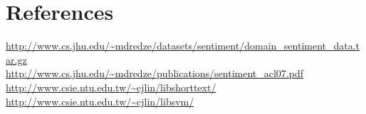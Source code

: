 \documentclass[10pt, a4paper]{article}
\begin{document}
\section{References}
\url{http://www.cs.jhu.edu/~mdredze/datasets/sentiment/domain_sentiment_data.tar.gz} \\
\url{http://www.cs.jhu.edu/~mdredze/publications/sentiment_acl07.pdf} \\
\url{http://www.csie.ntu.edu.tw/~cjlin/libshorttext/} \\
\url{http://www.csie.ntu.edu.tw/~cjlin/libsvm/} \\
%
% 
\end{document}
